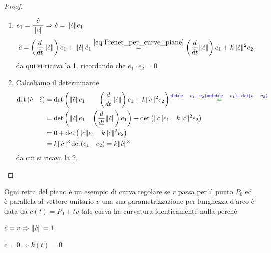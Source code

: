         \begin{proof}
        \mbox{}

        \begin{enumerate}
            \item $\displaystyle e_1 = \frac{\dot{c}}{\lVert\dot{c}\rVert} \Rightarrow \dot{c} = \lVert\dot{c}\rVert e_1$
            \[ \ddot{c} = \left(\frac{d}{dt} \lVert\dot{c}\rVert\right) e_1 + \lVert\dot{c}\rVert \dot{e}_1  \overset{\eqref{eq:Frenet_per_curve_piane}}{=} \left(\frac{d}{dt} \lVert\dot{c}\rVert\right) e_1 + k \lVert\dot{c}\rVert^2 e_2  \]
            da qui si ricava la \textcolor{black}{1.} ricordando che $e_1 \cdot e_2 = 0$
            \item Calcoliamo il determinante 
            \begin{align*} \det \left( \dot{c} \quad \ddot{c} \right) &= \det \left( \norm{\dot{c}} e_1 \qquad  \left(\frac{d}{dt} \norm{\dot{c}}\right) e_1 + k \norm{\dot{c}}^2 e_2 \right) \textcolor{blu}{\overset{ \det(v \quad v_1+v_2) = \det (v \quad v_1) + \det(v \quad v_2) }{\textcolor{verde}{=}}} \\
            &= \det \left( \norm{\dot{c}} e_1 \quad \left(\frac{d}{dt} \norm{\dot{c}}\right) e_1 \right) + \det \left( \norm{\dot{c}} e_1 \quad k \norm{\dot{c}}^2 e_2 \right) \\ 
            &= 0 + \det \left( \norm{\dot{c}} e_1 \quad k \norm{\dot{c}}^2 e_2 \right) \\
            &= k \norm{\dot{c}}^3 \det(e_1 \quad e_2) = k \norm{\dot{c}}^3 
            \end{align*}
            da cui si ricava la \textcolor{black}{2.}
        \end{enumerate}
        \end{proof}
        \begin{esempio}
        Ogni retta del piano è un esempio di curva regolare se $r$ passa per il punto $P_0$ ed è parallela al vettore unitario $v$ una sua parametrizzazione
        per lunghezza d'arco è data da $c(t) = P_0 + t v$
        tale curva ha curvatura identicamente nulla perché 
        
        $\dot{c}=v \Rightarrow \lVert\dot{c}\rVert = 1$ 
        
        $\ddot{c}=0 \Rightarrow k(t)=0$
        \end{esempio}
